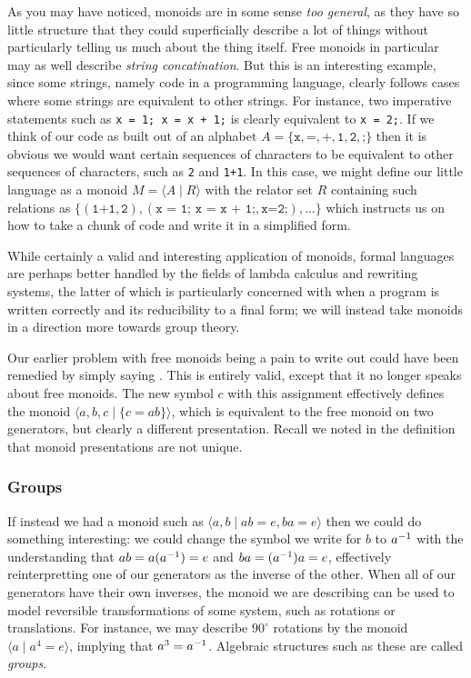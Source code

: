 \documentclass[11pt]{article}
\begin{document}
As you may have noticed, monoids are in some sense \emph{too general}, as they have so little structure that they could superficially describe a lot of things without particularly telling us much about the thing itself. Free monoids in particular may as well describe \emph{string concatination}. But this is an interesting example, since some strings, namely code in a programming language, clearly follows cases where some strings are equivalent to other strings. For instance, two imperative statements such as \texttt{x = 1; x = x + 1;} is clearly equivalent to \texttt{x = 2;}. If we think of our code as built out of an alphabet $A = \{\texttt{x},\texttt{=},\texttt{+},\texttt{1},\texttt{2},\texttt{;}\}$ then it is obvious we would want certain sequences of characters to be equivalent to other sequences of characters, such as \texttt{2} and \texttt{1+1}. In this case, we might define our little language as a monoid $M = \langle A \mid R \rangle$ with the relator set $R$ containing such relations as $\{(\texttt{1+1},\texttt{2}), (\texttt{x = 1; x = x + 1;},\texttt{x=2;}),...\}$ which instructs us on how to take a chunk of code and write it in a simplified form.

While certainly a valid and interesting application of monoids, formal languages are perhaps better handled by the fields of lambda calculus and rewriting systems, the latter of which is particularly concerned with when a program is written correctly and its reducibility to a final  form; we will instead take monoids in a direction more towards group theory.

Our earlier problem with free monoids being a pain to write out could have been remedied by simply saying . This is entirely valid, except that it no longer speaks about free monoids. The new symbol $c$ with this assignment effectively defines the monoid $\langle a,b,c \mid \{c=ab \} \rangle$, which is equivalent to the free monoid on two generators, but clearly a different presentation. Recall we noted in the definition that monoid presentations are not unique.

\subsubsection{Groups}

If instead we had a monoid such as $\langle a,b \mid ab = e, ba = e \rangle$ then we could do something interesting: we could change the symbol we write for $b$ to $a^{-1}$ with the understanding that $ab = a (a^{-1}) = e$ and $ba = (a^{-1}) a = e$, effectively reinterpretting one of our generators as the inverse of the other. When all of our generators have their own inverses, the monoid we are describing can be used to model reversible transformations of some system, such as rotations or translations. For instance, we may describe $90^\circ$ rotations by the monoid $\langle a \mid a^4 = e \rangle$, implying that $a^3 = a^{-1}$. Algebraic structures such as these are called \emph{groups}.
\end{document}
